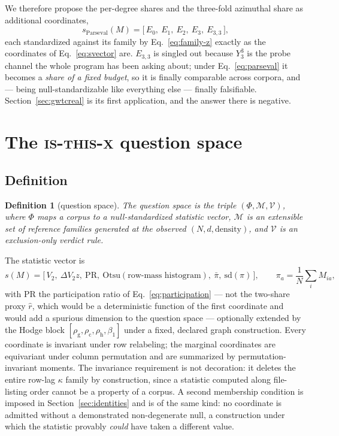 \documentclass[11pt,a4paper]{article}
\theoremstyle{plain}
\newtheorem{definition}{Definition}
\theoremstyle{remark}
\theoremstyle{plain}
\begin{document}
We therefore propose the per-degree shares and the three-fold azimuthal share as additional coordinates,
\begin{equation}
s_{\mathrm{Parseval}}(M)=\big[\,E_0,\ E_1,\ E_2,\ E_3,\ E_{3,3}\,\big],
\label{eq:parsevalcoords}
\end{equation}
each standardized against its family by Eq.~\eqref{eq:family-z} exactly as the coordinates of Eq.~\eqref{eq:svector} are. $E_{3,3}$ is singled out because $Y_3^3$ is the probe channel the whole program has been asking about; under Eq.~\eqref{eq:parseval} it becomes a \emph{share of a fixed budget}, so it is finally comparable across corpora, and --- being null-standardizable like everything else --- finally falsifiable. Section~\ref{sec:gwtcreal} is its first application, and the answer there is negative.

\section{The \textsc{is-this-x} question space}
\label{sec:isthisx}

\subsection{Definition}

\begin{definition}[question space]
\label{def:qspace}
The question space is the triple $(\Phi,\mathcal{M},\mathcal{V})$, where $\Phi$ maps a corpus to a null-standardized statistic vector, $\mathcal{M}$ is an extensible set of reference families generated at the observed $(N,d,\text{density})$, and $\mathcal{V}$ is an exclusion-only verdict rule.
\end{definition}

The statistic vector is
\begin{equation}
s(M)=\big[\,V_2,\ \Delta V_2z,\ \mathrm{PR},\ \mathrm{Otsu}(\text{row-mass histogram}),\ \bar\pi,\ \mathrm{sd}(\pi)\,\big],
\qquad \pi_a=\frac1N\sum_iM_{ia},
\label{eq:svector}
\end{equation}
with $\mathrm{PR}$ the participation ratio of Eq.~\eqref{eq:participation} --- not the two-share proxy $\hat r$, which would be a deterministic function of the first coordinate and would add a spurious dimension to the question space --- optionally extended by the Hodge block $[\rho_{\mathrm g},\rho_{\mathrm c},\rho_{\mathrm h},\beta_1]$ under a fixed, declared graph construction. Every coordinate is invariant under row relabeling; the marginal coordinates are equivariant under column permutation and are summarized by permutation-invariant moments. The invariance requirement is not decoration: it deletes the entire row-lag $\kappa$ family by construction, since a statistic computed along file-listing order cannot be a property of a corpus. A second membership condition is imposed in Section~\ref{sec:identities} and is of the same kind: no coordinate is admitted without a demonstrated non-degenerate null, a construction under which the statistic provably \emph{could} have taken a different value.
\end{document}
